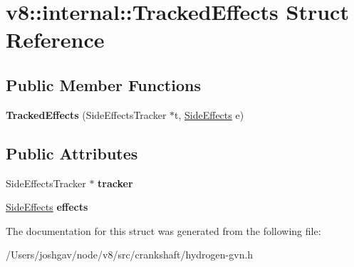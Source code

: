 \hypertarget{structv8_1_1internal_1_1_tracked_effects}{}\section{v8\+:\+:internal\+:\+:Tracked\+Effects Struct Reference}
\label{structv8_1_1internal_1_1_tracked_effects}
\subsection*{Public Member Functions}
\begin{DoxyCompactItemize}
\item 
{\bfseries Tracked\+Effects} (Side\+Effects\+Tracker $\ast$t, \hyperlink{classv8_1_1internal_1_1_side_effects}{Side\+Effects} e)\hypertarget{structv8_1_1internal_1_1_tracked_effects_ac879e606f973dd621860741abbe673d5}{}\label{structv8_1_1internal_1_1_tracked_effects_ac879e606f973dd621860741abbe673d5}

\end{DoxyCompactItemize}
\subsection*{Public Attributes}
\begin{DoxyCompactItemize}
\item 
Side\+Effects\+Tracker $\ast$ {\bfseries tracker}\hypertarget{structv8_1_1internal_1_1_tracked_effects_a69e0f2436c6018eb292a3eedc0f382e7}{}\label{structv8_1_1internal_1_1_tracked_effects_a69e0f2436c6018eb292a3eedc0f382e7}

\item 
\hyperlink{classv8_1_1internal_1_1_side_effects}{Side\+Effects} {\bfseries effects}\hypertarget{structv8_1_1internal_1_1_tracked_effects_a746806e15b28a33b79c66e8ff855f090}{}\label{structv8_1_1internal_1_1_tracked_effects_a746806e15b28a33b79c66e8ff855f090}

\end{DoxyCompactItemize}


The documentation for this struct was generated from the following file\+:\begin{DoxyCompactItemize}
\item 
/\+Users/joshgav/node/v8/src/crankshaft/hydrogen-\/gvn.\+h\end{DoxyCompactItemize}
